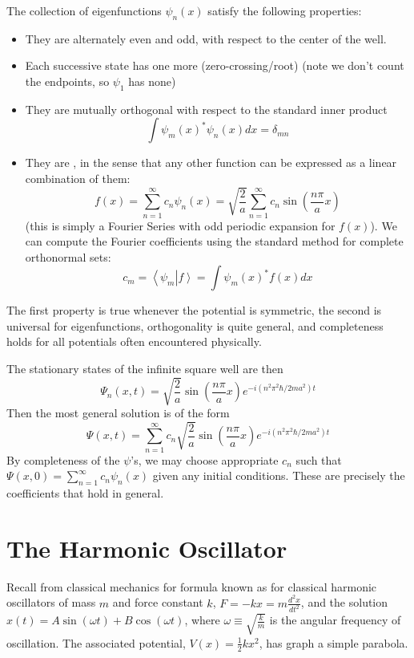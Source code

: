 \documentclass[12pt, a4paper, oneside, openright, titlepage]{book}
\newcommand{\braket}[2]{\left\langle#1\right\vert\left.#2\right\rangle}
\begin{document}
\begin{prop}
    The collection of eigenfunctions $\psi_n(x)$ satisfy the following properties: \begin{itemize}
        \item They are alternately even and odd, with respect to the center of the well.
        \item Each successive state has one more  (zero-crossing/root) (note we don't count the endpoints, so $\psi_1$ has none)
        \item They are mutually orthogonal with respect to the standard inner product $$\int\psi_m(x)^*\psi_n(x)dx = \delta_{mn}$$
        \item They are , in the sense that any other function can be expressed as a linear combination of them: $$f(x) = \sum_{n=1}^{\infty}c_n\psi_n(x) = \sqrt{\frac{2}{a}}\sum_{n=1}^{\infty}c_n\sin\left(\frac{n\pi}{a}x\right)$$
            (this is simply a Fourier Series with odd periodic expansion for $f(x)$). We can compute the Fourier coefficients using the standard method for complete orthonormal sets: $$c_m = \braket{\psi_m}{f} = \int\psi_m(x)^*f(x)dx$$
    \end{itemize}
\end{prop}


The first property is true whenever the potential is symmetric, the second is universal for eigenfunctions, orthogonality is quite general, and completeness holds for all potentials often encountered physically.

The stationary states of the infinite square well are then $$\Psi_n(x,t) = \sqrt{\frac{2}{a}}\sin\left(\frac{n\pi}{a}x\right)e^{-i(n^2\pi^2\hbar/2ma^2)t}$$ Then the most general solution is of the form $$\Psi(x,t) = \sum_{n=1}^{\infty}c_n\sqrt{\frac{2}{a}}\sin\left(\frac{n\pi}{a}x\right)e^{-i(n^2\pi^2\hbar/2ma^2)t}$$
By completeness of the $\psi$'s, we may choose appropriate $c_n$ such that $\Psi(x,0) = \sum_{n=1}^{\infty}c_n\psi_n(x)$ given any initial conditions. These are precisely the coefficients that hold in general.


\section{The Harmonic Oscillator}


Recall from classical mechanics for formula known as  for classical harmonic oscillators of mass $m$ and force constant $k$, $F = -kx = m\frac{d^2x}{dt^2}$, and the solution $x(t) = A\sin(\omega t) + B\cos(\omega t)$, where $\omega \equiv \sqrt{\frac{k}{m}}$ is the angular frequency of oscillation. The associated potential, $V(x) = \frac{1}{2}kx^2$, has graph a simple parabola.
\end{document}
